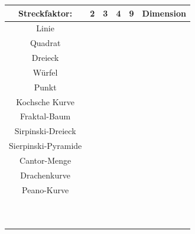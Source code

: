 \documentclass[a4paper,ngerman,12pt]{scrartcl}
\theoremstyle{definition}
\theoremstyle{plain}
\theoremstyle{remark}
\begin{document}
\pagestyle{empty}

	\begin{center}\renewcommand{\arraystretch}{2}
		\begin{tabular}{c||c|c|c|c||c}
			Streckfaktor: & \hspace{2em}2\hspace{2em} & \hspace{2em}3\hspace{2em} & \hspace{2em}4\hspace{2em} & \hspace{2em}9\hspace{2em} & Dimension\\\hline
			Linie & & & & & \\
			Quadrat & & & & & \\
			Dreieck & & & & & \\
			Würfel & & & & & \\
			Punkt & & & & & \\\hline
			Kochsche Kurve& & & & & \\
			Fraktal-Baum & & & & & \\
			Sirpinski-Dreieck & & & & & \\
			Sierpinski-Pyramide & & & & & \\
			Cantor-Menge & & & & & \\
			Drachenkurve & & & & & \\
			Peano-Kurve & & & & & \\
			 & & & & & \\
			 & & & & & \\
			 & & & & & \\
			 & & & & & \\
			 & & & & & \\
			 & & & & & \\
			 & & & & & \\
			 & & & & & \\
			 & & & & & \\
			 & & & & & \\
		\end{tabular}
	\end{center}
\end{document}
